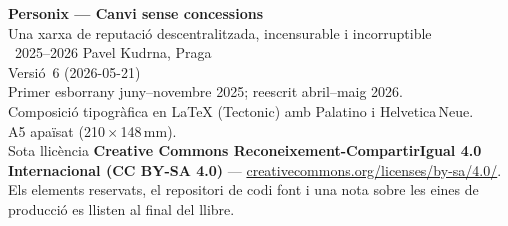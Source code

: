 \thispagestyle{empty}
\ifdefined\printmode\vspace*{\fill}\else{}\fi
\begin{flushleft}\small\sffamily
\textbf{Personix --- Canvi sense concessions}\\[0.3em]
Una xarxa de reputació descentralitzada, incensurable i incorruptible\\[1.4em]

\textcopyright\ 2025--2026 Pavel Kudrna, Praga\\[0.4em]

Versió~6 (2026-05-21)\\
Primer esborrany juny--novembre 2025; reescrit abril--maig 2026.\\[1.4em]

Composició tipogràfica en \LaTeX{} (Tectonic) amb Palatino i Helvetica\,Neue.\\
A5 apaïsat (210\,$\times$\,148\,mm).\\[1.4em]

Sota llicència \textbf{Creative Commons Reconeixement-CompartirIgual 4.0
Internacional (CC BY-SA 4.0)} ---
\href{https://creativecommons.org/licenses/by-sa/4.0/}{creativecommons.org/licenses/by-sa/4.0/}.
Els elements reservats, el repositori de codi font i una nota sobre les eines
de producció es llisten al final del llibre.
\end{flushleft}
\ifdefined\printmode\else{}\fi
\clearpage
